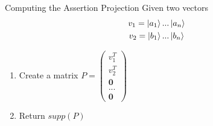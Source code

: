 \documentclass[11pt,svgnames,smaller,aspectratio=43,english]{beamer}
\begin{document}
\begin{frame}{Computing the Assertion Projection}
	Given two vectors
	\begin{gather*}
		v_1 = \ket{a_1}...\ket{a_n}\\
		v_2 = \ket{b_1}...\ket{b_n}
	\end{gather*}
	\begin{enumerate}
		\item Create a matrix $P = \begin{pmatrix}
			v_1^T \\ v_2^T \\ \mathbf{0} \\ ... \\ \mathbf{0}
		\end{pmatrix}$
		\item Return $supp(P)$
	\end{enumerate}
\end{frame}


\end{document}
